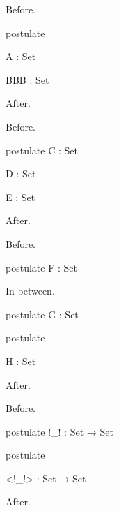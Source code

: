 \documentclass{article}
\begin{document}
\noindent Before.
\begin{AgdaMultiCode}
\begin{code}[hide]
  postulate
\end{code}
\begin{code}
    A    : Set
\end{code}
\begin{code}
    BBB  : Set
\end{code}
\end{AgdaMultiCode}
After.

\noindent Before.
\begin{AgdaAlign}
\begin{code}
  postulate
    C : Set
\end{code}
\begin{code}[hide]
    D : Set
\end{code}
\begin{code}
    E : Set
\end{code}
\end{AgdaAlign}
After.

\noindent Before.
\begin{AgdaAlign}
\begin{code}
  postulate
    F : Set
\end{code}
In between.
\begin{AgdaSuppressSpace}
\begin{code}
  postulate
    G : Set
\end{code}
\begin{code}[hide]
  postulate
\end{code}
\begin{code}
    H : Set
\end{code}
\end{AgdaSuppressSpace}
\end{AgdaAlign}
After.

\noindent Before.
\begin{AgdaMultiCode}
\begin{code}
  postulate
    !_!    : Set → Set
\end{code}
\begin{code}[hide]
  postulate
\end{code}
\begin{code}
    <!_!>  : Set → Set
\end{code}
\end{AgdaMultiCode}
After.
\end{document}
